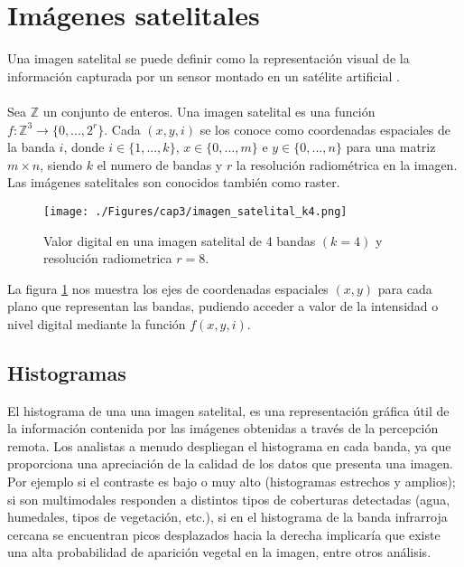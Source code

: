 \section{Im\'agenes satelitales}

Una imagen satelital se puede definir como la representaci\'on visual de la informaci\'on capturada por un sensor montado en un sat\'elite artificial \cite{acosta2003experiencia}. \\~\\
Sea $ \mathbb{Z} $ un conjunto de enteros. Una imagen satelital es una funci\'on $ f:\mathbb{Z}^{3} \longrightarrow \{0,...,2^{r}\} $. Cada $ (x,y,i) $ se los conoce como coordenadas espaciales de la banda $ i $, donde $ i \in \{1,...,k\} $, $ x \in \{0,...,m\} $ e $ y \in \{0,...,n\} $ para una matriz $ m \times n $, siendo $ k $ el numero de bandas y $ r $ la resoluci\'on radiom\'etrica en la imagen. Las im\'agenes satelitales son conocidos tambi\'en como raster.
  \begin{figure}[H]
  	\centering
  	\texttt{[image: ./Figures/cap3/imagen\_satelital\_k4.png]}
  	\caption{Valor digital en una imagen satelital de 4 bandas $ (k=4) $ y resoluci\'on radiometrica $ r=8 $.}
  	\label{fig:imagenMultiespectral}
  \end{figure}
La figura \ref{fig:imagenMultiespectral} nos muestra los ejes de coordenadas espaciales $ (x,y) $ para cada plano que representan las bandas, pudiendo acceder a valor de la intensidad o nivel digital mediante la funci\'on $ f(x,y,i) $.


\subsection{Histogramas}
El histograma de una una imagen satelital, es una representaci\'on gr\'afica \'util de la informaci\'on contenida por las im\'agenes obtenidas a trav\'es de la percepci\'on remota. Los analistas a menudo despliegan el histograma en cada banda, ya que proporciona una apreciaci\'on de la calidad de los datos que presenta una imagen. Por ejemplo si el contraste es bajo o muy alto (histogramas estrechos y amplios); si son multimodales responden a distintos tipos de coberturas detectadas (agua, humedales, tipos de vegetaci\'on, etc.), si en  el histograma de la banda infrarroja cercana se encuentran picos desplazados hacia la derecha implicar\'ia que existe una alta probabilidad de aparici\'on vegetal en la imagen, entre otros an\'alisis.

